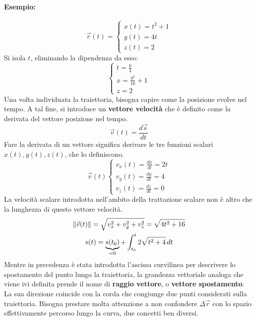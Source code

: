 \documentclass[10pt,a4paper]{book}
\DeclarePairedDelimiter{\norma}{\lVert}{\rVert} %
\begin{document}
\paragraph{Esempio:}
\[
	\vec{r}(t)=
		\begin{cases}
			x(t)=t^2+1 \\
			y(t)=4t \\
			z(t)=2
		\end{cases}
\]
Si isola $t$, eliminando la dipendenza da esso:
\[
	\begin{cases}
		t=\frac{y}{4} \\
		x=\frac{y^2}{16}+1 \\
		z=2
	\end{cases}
\]
Una volta individuata la traiettoria, bisogna capire come la posizione evolve nel tempo. A tal fine, si introduce un \textbf{vettore velocità} che è definito come la derivata del vettore posizione nel tempo.
\[
	\vec{v}(t)=\frac{d\vec{s}}{dt}
\]
Fare la derivata di un vettore significa derivare le tre funzioni scalari $x(t), y(t), z(t)$, che lo definiscono.	
\[
	\vec{v}(t)
		\begin{cases}
			v_x(t)=\frac{dx}{dt}=2t \\
			v_y(t)=\frac{dy}{dt}=4 \\
			v_z(t)=\frac{dz}{dt}=0
		\end{cases}
\]
La velocità scalare introdotta nell'ambito della trattazione scalare non è altro che la lunghezza di questo vettore velocità.
\begin{gather*}
	\norma{\vec{v}(t)}=\sqrt{v_x^2+v_y^2+v_z^2}=\sqrt{4t^2+16} \\
	s(t)=\underbrace{s(t_0)}_{=0}+\int^t_{t_0} 2\sqrt{t^2+4}\,dt
\end{gather*}
Mentre in precedenza è stata introdotta l'ascissa curvilinea per descrivere lo spostamento del punto lungo la traiettoria, la grandezza vettoriale analoga che viene ivi definita prende il nome di \textbf{raggio vettore}, o \textbf{vettore spostamento}. La sua direzione coincide con la corda che congiunge due punti considerati sulla traiettoria. Bisogna prestare molta attenzione a non confondere $\Delta\vec{r}$ con lo spazio effettivamente percorso lungo la curva, due concetti ben diversi.
\end{document}
